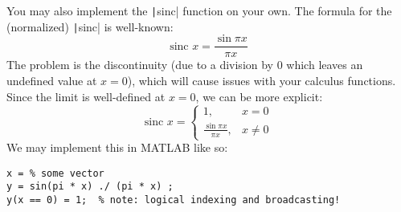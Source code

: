 \documentclass{article}
\begin{document}
\begin{description}
  You may also implement the \texttt|sinc| function on your own. The formula for the (normalized) \texttt|sinc| is well-known: \[\text{sinc }x = \frac{\sin\pi x}{\pi x}\] The problem is the discontinuity (due to a division by 0 which leaves an undefined value at $x=0$), which will cause issues with your calculus functions. Since the limit is well-defined at $x=0$, we can be more explicit: \[\text{sinc }x=
    \begin{cases}
      1, & x=0 \\
      \frac{\sin\pi x}{\pi x}, & x\ne 0
    \end{cases}
  \] We may implement this in MATLAB like so:
\begin{verbatim}
x = % some vector
y = sin(pi * x) ./ (pi * x) ;
y(x == 0) = 1;  % note: logical indexing and broadcasting!
\end{verbatim}
\end{description}
\end{document}
